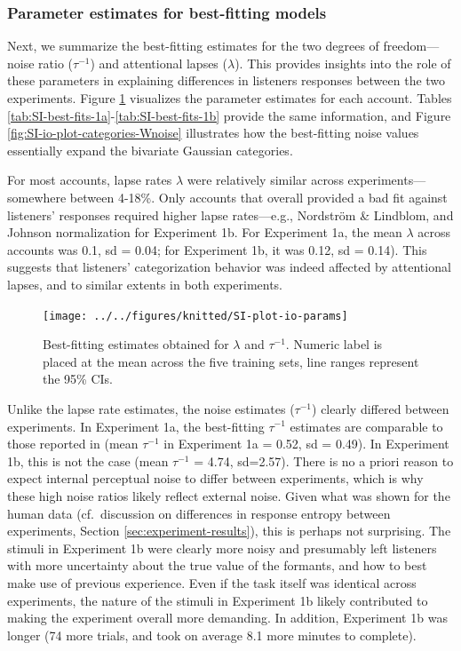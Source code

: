 \documentclass[preprint]{JASA}
\begin{document}
\subsubsection{Parameter estimates for best-fitting models}\label{sec:SI-param-est}

Next, we summarize the best-fitting estimates for the two degrees of freedom---noise ratio (\(\tau^{-1}\)) and attentional lapses (\(\lambda\)). This provides insights into the role of these parameters in explaining differences in listeners responses between the two experiments. Figure \ref{fig:SI-plot-io-params} visualizes the parameter estimates for each account. Tables \ref{tab:SI-best-fits-1a}-\ref{tab:SI-best-fits-1b} provide the same information, and Figure \ref{fig:SI-io-plot-categories-Wnoise} illustrates how the best-fitting noise values essentially expand the bivariate Gaussian categories.

For most accounts, lapse rates \(\lambda\) were relatively similar across experiments---somewhere between 4-18\%. Only accounts that overall provided a bad fit against listeners' responses required higher lapse rates---e.g., Nordström \& Lindblom, and Johnson normalization for Experiment 1b. For Experiment 1a, the mean \(\lambda\) across accounts was 0.1, sd = 0.04; for Experiment 1b, it was 0.12, sd = 0.14). This suggests that listeners' categorization behavior was indeed affected by attentional lapses, and to similar extents in both experiments.



\begin{figure}

{\centering \texttt{[image: ../../figures/knitted/SI-plot-io-params]} 

}

\caption{Best-fitting estimates obtained for \(\lambda\) and \(\tau^{-1}\). Numeric label is placed at the mean across the five training sets, line ranges represent the 95\% CIs.}\label{fig:SI-plot-io-params}
\end{figure}

Unlike the lapse rate estimates, the noise estimates (\(\tau^{-1}\)) clearly differed between experiments. In Experiment 1a, the best-fitting \(\tau^{-1}\) estimates are comparable to those reported in \citet{kronrod2016} (mean \(\tau^{-1}\) in Experiment 1a = 0.52, sd = 0.49). In Experiment 1b, this is not the case (mean \(\tau^{-1}\) = 4.74, sd=2.57). There is no a priori reason to expect internal perceptual noise to differ between experiments, which is why these high noise ratios likely reflect external noise. Given what was shown for the human data (cf.~discussion on differences in response entropy between experiments, Section \ref{sec:experiment-results}), this is perhaps not surprising. The stimuli in Experiment 1b were clearly more noisy and presumably left listeners with more uncertainty about the true value of the formants, and how to best make use of previous experience. Even if the task itself was identical across experiments, the nature of the stimuli in Experiment 1b likely contributed to making the experiment overall more demanding. In addition, Experiment 1b was longer (74 more trials, and took on average 8.1 more minutes to complete).
\end{document}
